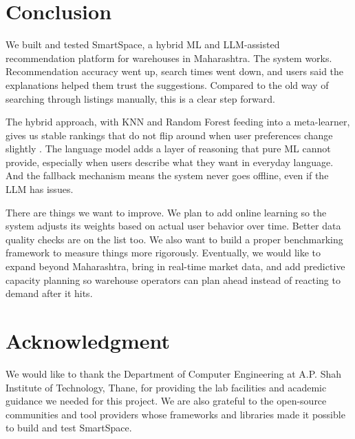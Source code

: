 \documentclass[conference]{IEEEtran}
\begin{document}
\section{Conclusion}
We built and tested SmartSpace, a hybrid ML and LLM-assisted recommendation platform for warehouses in Maharashtra. The system works. Recommendation accuracy went up, search times went down, and users said the explanations helped them trust the suggestions. Compared to the old way of searching through listings manually, this is a clear step forward.

The hybrid approach, with KNN and Random Forest feeding into a meta-learner, gives us stable rankings that do not flip around when user preferences change slightly \cite{b2}. The language model adds a layer of reasoning that pure ML cannot provide, especially when users describe what they want in everyday language. And the fallback mechanism means the system never goes offline, even if the LLM has issues.

There are things we want to improve. We plan to add online learning so the system adjusts its weights based on actual user behavior over time. Better data quality checks are on the list too. We also want to build a proper benchmarking framework to measure things more rigorously. Eventually, we would like to expand beyond Maharashtra, bring in real-time market data, and add predictive capacity planning so warehouse operators can plan ahead instead of reacting to demand after it hits.

\section*{Acknowledgment}
We would like to thank the Department of Computer Engineering at A.P. Shah Institute of Technology, Thane, for providing the lab facilities and academic guidance we needed for this project. We are also grateful to the open-source communities and tool providers whose frameworks and libraries made it possible to build and test SmartSpace.
\end{document}
